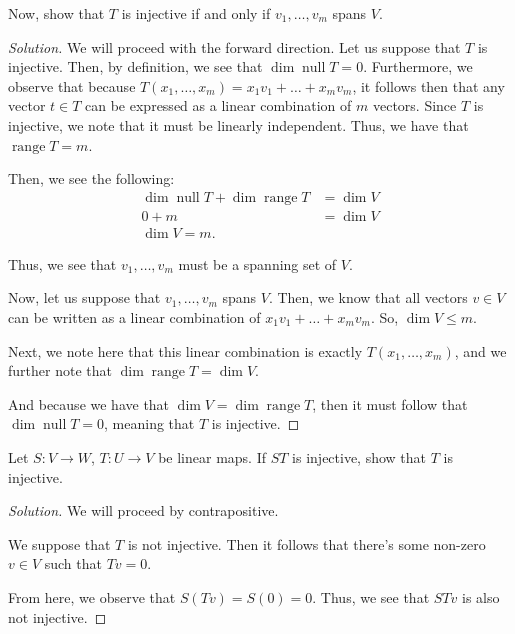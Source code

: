 \documentclass[openany]{book}
\newenvironment{solution}{\begin{proof}[Solution]}{\end{proof}}
\DeclareMathOperator*{\vnull}{null}
\DeclareMathOperator*{\vrange}{range}
\begin{document}
\begin{hw}
	Now, show that $T$ is injective if and only if $v_{1}, \ldots, v_{m}$ spans $V$.
\end{hw}
\begin{solution}
	We will proceed with the forward direction. Let us suppose that $T$ is injective. Then, by definition, we see that $\dim \vnull T = 0$. Furthermore, we observe that because $T(x_{1}, \ldots, x_{m}) = x_{1}v_{1} + \ldots + x_{m}v_{m}$, it follows then that any vector $t \in T$ can be expressed as a linear combination of $m$ vectors. Since $T$ is injective, we note that it must be linearly independent. Thus, we have that $\vrange T = m$.
	
	Then, we see the following:
	\begin{align*}
		\dim \vnull T + \dim \vrange T &= \dim V \\
		0 + m &= \dim V \\
		\dim V = m.
	\end{align*}

	Thus, we see that $v_{1}, \ldots, v_{m}$ must be a spanning set of $V$.
	
	Now, let us suppose that $v_{1}, \ldots, v_{m}$ spans $V$. Then, we know that all vectors $v \in V$ can be written as a linear combination of $x_{1}v_{1} + \ldots + x_{m}v_{m}$. So, $\dim V \leq m$.
	
	Next, we note here that this linear combination is exactly $T(x_{1}, \ldots, x_{m})$, and we further note that $\dim \vrange T = \dim V$.
	
	And because we have that $\dim V = \dim \vrange T$, then it must follow that $\dim \vnull T = 0$, meaning that $T$ is injective.
\end{solution}

\begin{hw}
	Let $S : V \rightarrow W$, $T: U \rightarrow V$ be linear maps. If $ST$ is injective, show that $T$ is injective.
\end{hw}
\begin{solution}
	\begin{comment}
		We suppose that $ST$ is injective. Then, by definiteion, we observe that if $ST(v) = ST(w)$, then $v = w$.
		
		We observe the following:
		
		Suppose we have $T(v) = T(w)$. Then, $ST(v) = ST(w) \implies v = w$. So, we have that $T(v) = T(w) \implies v = w$.
	\end{comment}
	
	We will proceed by contrapositive.
	
	We suppose that $T$ is not injective. Then it follows that there's some non-zero $v \in V$ such that $Tv = 0$.
	
	From here, we observe that $S(Tv) = S(0) = 0$. Thus, we see that $STv$ is also not injective.
\end{solution}
\end{document}
